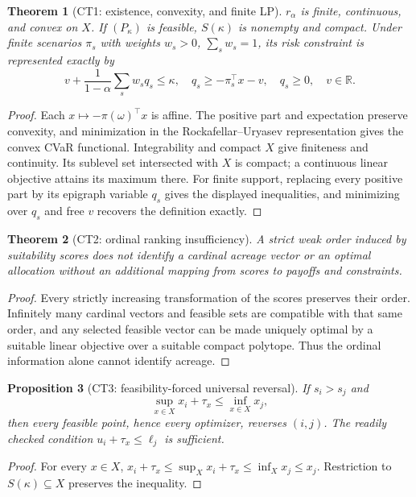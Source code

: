 \documentclass[11pt]{article}
\newtheorem{theorem}{Theorem}
\newtheorem{proposition}[theorem]{Proposition}
\theoremstyle{definition}
\begin{document}
\begin{theorem}[CT1: existence, convexity, and finite LP]\label{ct1}
$r_\alpha$ is finite, continuous, and convex on $X$.  If
$(P_\kappa)$ is feasible, $S(\kappa)$ is nonempty and compact.  Under
finite scenarios $\pi_s$ with weights $w_s>0$, $\sum_s w_s=1$, its risk
constraint is represented exactly by
\[
v+\frac{1}{1-\alpha}\sum_s w_sq_s\le\kappa,\quad
q_s\ge-\pi_s^\top x-v,\quad q_s\ge0,\quad v\in\mathbb R.
\]
\end{theorem}
\begin{proof}
Each $x\mapsto-\pi(\omega)^\top x$ is affine.  The positive part and
expectation preserve convexity, and minimization in the Rockafellar--Uryasev
representation gives the convex CVaR functional.  Integrability and compact
$X$ give finiteness and continuity.  Its sublevel set intersected with $X$
is compact; a continuous linear objective attains its maximum there.
For finite support, replacing every positive part by its epigraph variable
$q_s$ gives the displayed inequalities, and minimizing over $q_s$ and free
$v$ recovers the definition exactly.
\end{proof}

\begin{theorem}[CT2: ordinal ranking insufficiency]\label{ct2}
A strict weak order induced by suitability scores does not identify a
cardinal acreage vector or an optimal allocation without an additional
mapping from scores to payoffs and constraints.
\end{theorem}
\begin{proof}
Every strictly increasing transformation of the scores preserves their
order.  Infinitely many cardinal vectors and feasible sets are compatible
with that same order, and any selected feasible vector can be made uniquely
optimal by a suitable linear objective over a suitable compact polytope.
Thus the ordinal information alone cannot identify acreage.
\end{proof}

\begin{proposition}[CT3: feasibility-forced universal reversal]\label{ct3}
If $s_i>s_j$ and
\[
\sup_{x\in X}x_i+\tau_x\le\inf_{x\in X}x_j,
\]
then every feasible point, hence every optimizer, reverses $(i,j)$.
The readily checked condition $u_i+\tau_x\le\ell_j$ is sufficient.
\end{proposition}
\begin{proof}
For every $x\in X$, $x_i+\tau_x\le\sup_Xx_i+\tau_x
\le\inf_Xx_j\le x_j$.  Restriction to $S(\kappa)\subseteq X$ preserves
the inequality.
\end{proof}
\end{document}
